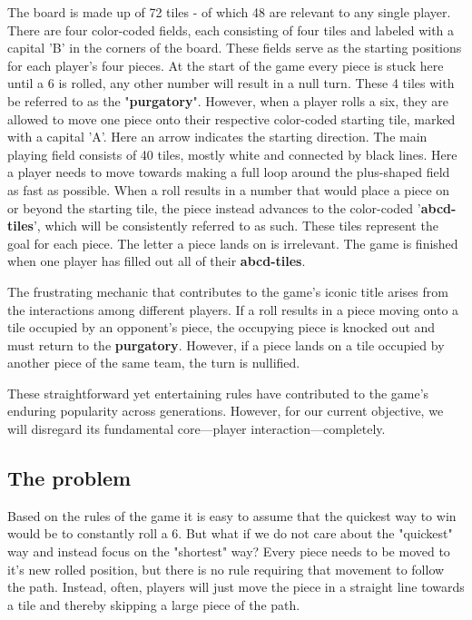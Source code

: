 \documentclass[12pt]{article}
\begin{document}
The board is made up of 72 tiles - of which 48 are relevant to any single player.
There are four color-coded fields, each consisting of four tiles and labeled with a capital 'B' in the corners of the board. These fields serve as the starting positions for each player's four pieces. At the start of the game every piece is stuck here until a 6 is rolled, any other number will result in a null turn. These 4 tiles with be referred to as the "\textbf{purgatory}". However, when a player rolls a six, they are allowed to move one piece onto their respective color-coded starting tile, marked with a capital 'A'. Here an arrow indicates the starting direction. 
The main playing field consists of 40 tiles, mostly white and connected by black lines.
Here a player needs to move towards making a full loop around the plus-shaped field as fast as possible.
When a roll results in a number that would place a piece on or beyond the starting tile, the piece instead advances to the color-coded '\textbf{abcd-tiles}', which will be consistently referred to as such. These tiles represent the goal for each piece.
The letter a piece lands on is irrelevant. The game is finished when one player has filled out all of their \textbf{abcd-tiles}.

The frustrating mechanic that contributes to the game's iconic title arises from the interactions among different players. If a roll results in a piece moving onto a tile occupied by an opponent's piece, the occupying piece is knocked out and must return to the \textbf{purgatory}.
However, if a piece lands on a tile occupied by another piece of the same team, the turn is nullified.

These straightforward yet entertaining rules have contributed to the game's enduring popularity across generations. However, for our current objective, we will disregard its fundamental core—player interaction—completely.



\subsection{The problem}
Based on the rules of the game it is easy to assume that the quickest way to win would be to constantly roll a 6.
But what if we do not care about the "quickest" way and instead focus on the "shortest" way?
Every piece needs to be moved to it's new rolled position, but there is no rule requiring that movement to follow the path.
Instead, often, players will just move the piece in a straight line towards a tile and thereby skipping a large piece of the path. 
\end{document}
